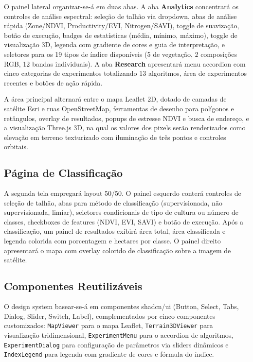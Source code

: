 \documentclass[12pt, a4paper]{article}
\begin{document}
O painel lateral organizar-se-á em duas abas. A aba \textbf{Analytics} concentrará os controles de análise espectral: seleção de talhão via dropdown, abas de análise rápida (Zone/NDVI, Productivity/EVI, Nitrogen/SAVI), toggle de suavização, botão de execução, badges de estatísticas (média, mínimo, máximo), toggle de visualização 3D, legenda com gradiente de cores e guia de interpretação, e seletores para os 19 tipos de índice disponíveis (5 de vegetação, 2 composições RGB, 12 bandas individuais). A aba \textbf{Research} apresentará menu accordion com cinco categorias de experimentos totalizando 13 algoritmos, área de experimentos recentes e botões de ação rápida.

A área principal alternará entre o mapa Leaflet 2D, dotado de camadas de satélite Esri e ruas OpenStreetMap, ferramentas de desenho para polígonos e retângulos, overlay de resultados, popups de estresse NDVI e busca de endereço, e a visualização Three.js 3D, na qual os valores dos pixels serão renderizados como elevação em terreno texturizado com iluminação de três pontos e controles orbitais.

\subsection{Página de Classificação}

A segunda tela empregará layout 50/50. O painel esquerdo conterá controles de seleção de talhão, abas para método de classificação (supervisionada, não supervisionada, limiar), seletores condicionais de tipo de cultura ou número de classes, checkboxes de features (NDVI, EVI, SAVI) e botão de execução. Após a classificação, um painel de resultados exibirá área total, área classificada e legenda colorida com porcentagem e hectares por classe. O painel direito apresentará o mapa com overlay colorido de classificação sobre a imagem de satélite.

\subsection{Componentes Reutilizáveis}

O design system basear-se-á em componentes shadcn/ui (Button, Select, Tabs, Dialog, Slider, Switch, Label), complementados por cinco componentes customizados: \texttt{MapViewer} para o mapa Leaflet, \texttt{Terrain3DViewer} para visualização tridimensional, \texttt{ExperimentMenu} para o accordion de algoritmos, \texttt{Experiment\-Dialog} para configuração de parâmetros via sliders dinâmicos e \texttt{IndexLegend} para legenda com gradiente de cores e fórmula do índice.
\end{document}
